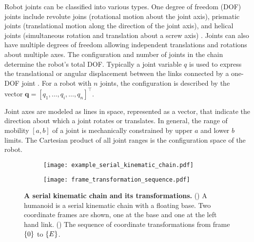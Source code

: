 Robot joints can be classified into various types. One degree of freedom (DOF) joints include revolute joins (rotational motion about the joint axis), prismatic joints (translational motion along the direction of the joint axis), and  helical joints (simultaneous rotation and translation about a screw axis) \cite{Lynch2017Modernrobotics}. Joints can also have multiple degrees of freedom allowing independent translations and rotations about multiple axes. The configuration and number of joints in the chain determine the robot's total DOF. Typically a joint variable $q$ is used to express the translational or angular displacement between the links connected by a one-DOF joint \cite{Xie2003FundamentalsRoboticsLinking}. For a robot with $n$ joints, the configuration is described by the vector $\bm{q} = [q_1,\ldots,q_i,\ldots,q_n]^\intercal$.

Joint axes are modeled as lines in space, represented as a vector, that indicate the direction about which a joint rotates or translates. In general, the range of mobility $\left[a,b\right] $ of a joint is mechanically constrained by upper $a$ and lower $b$ limits. The Cartesian product of all joint ranges is the configuration space of the robot.

\begin{figure*}[!t]
	\centering	
	\hspace*{\fill}
	\begin{subfigure}[t]{0.40\textwidth}
		\subcaption{}
		\texttt{[image: example\_serial\_kinematic\_chain.pdf]}
		\label{fig:example_serial_kinematic_chain}
	\end{subfigure}	
	\hfill
	\begin{subfigure}[t]{0.40\textwidth}
		\subcaption{}
		\texttt{[image: frame\_transformation\_sequence.pdf]}
		\label{fig:transformation_sequence}
	\end{subfigure}	
	\hspace*{\fill}
	\caption{\label{fig:serial_kinematic_chain} \textbf{A serial kinematic chain and its transformations.} ()  A humanoid is a serial kinematic chain with a floating base. Two coordinate frames are shown, one at the base and one at the left hand link. () The sequence of coordinate transformations from frame ${\left\lbrace 0 \right\rbrace}$ to ${\left\lbrace E \right\rbrace}$.}
\end{figure*}

